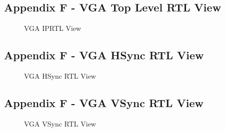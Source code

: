 \documentclass[a4paper,12pt]{article}
\begin{document}
\subsection{Appendix F - VGA Top Level RTL View}
\begin{figure}[H]
	\centering
	\caption{VGA IPRTL View}
\end{figure}
\begin{flushleft}
\-
\end{flushleft}
\newpage
\subsection{Appendix F - VGA HSync RTL View}
\begin{figure}[H]
	\centering
	\caption{VGA HSync RTL View}
\end{figure}
\begin{flushleft}
\-
\end{flushleft}
\subsection{Appendix F - VGA VSync RTL View}
\begin{figure}[H]
	\centering
	\caption{VGA VSync RTL View}
\end{figure}
\newpage
\end{document}
